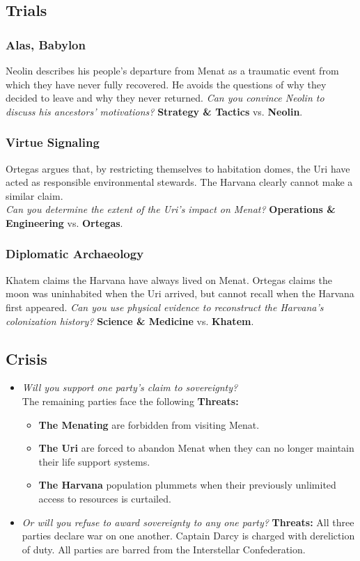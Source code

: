 \documentclass[11pt, a5paper, parskip=half-, DIV=12]{scrartcl}
\begin{document}
\subsection*{Trials}
\subsubsection*{Alas, Babylon}
Neolin describes his people's departure from Menat as a traumatic event from which they have never fully recovered. He avoids the questions of why they decided to leave and why they never returned. \textit{Can you convince Neolin to discuss his ancestors' motivations?} \textbf{Strategy \& Tactics} vs. \textbf{Neolin}.

\subsubsection*{Virtue Signaling}
Ortegas argues that, by restricting themselves to habitation domes, the Uri have acted as responsible environmental stewards. The Harvana clearly cannot make a similar claim. \\ \textit{Can you determine the extent of the Uri's impact on Menat?} \textbf{Operations \& Engineering} vs. \textbf{Ortegas}.

\subsubsection*{Diplomatic Archaeology}
Khatem claims the Harvana have always lived on Menat. Ortegas claims the moon was uninhabited when the Uri arrived, but cannot recall when the Harvana first appeared. \textit{Can you use physical evidence to reconstruct the Harvana's colonization history?} \textbf{Science \& Medicine} vs. \textbf{Khatem}.

\subsection*{Crisis}

\begin{itemize}
	\item \textit{Will you support one party's claim to sovereignty?} \\
	The remaining parties face the following \textbf{Threats:}  
	\begin{itemize}[noitemsep, topsep=-\baselineskip]
	\item \textbf{The Menating} are forbidden from visiting Menat.
	\item \textbf{The Uri} are forced to abandon Menat when they can no longer maintain their life support systems.
	\item \textbf{The Harvana} population plummets when their previously unlimited access to resources is curtailed.
	\end{itemize}
	\item \textit{Or will you refuse to award sovereignty to any one party?} \textbf{Threats:} All three parties declare war on one another. Captain Darcy is charged with dereliction of duty. All parties are barred from the Interstellar Confederation.
\end{itemize}
\end{document}
